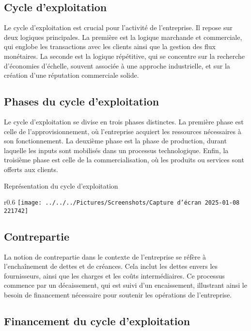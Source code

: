 \documentclass[a4paper, 12pt]{report}
\begin{document}
\subsection{Cycle d'exploitation}

Le cycle d'exploitation est crucial pour l'activité de l'entreprise. Il repose sur deux logiques principales. La première est la logique marchande et commerciale, qui englobe les transactions avec les clients ainsi que la gestion des flux monétaires. La seconde est la logique répétitive, qui se concentre sur la recherche d'économies d'échelle, souvent associée à une approche industrielle, et sur la création d'une réputation commerciale solide.

\subsection{Phases du cycle d'exploitation}

Le cycle d'exploitation se divise en trois phases distinctes. La première phase est celle de l'approvisionnement, où l'entreprise acquiert les ressources nécessaires à son fonctionnement. La deuxième phase est la phase de production, durant laquelle les inputs sont mobilisés dans un processus technologique. Enfin, la troisième phase est celle de la commercialisation, où les produits ou services sont offerts aux clients.
	
Représentation du cycle d'exploitation

\begin{wrapfigure}{r}{0.6\textwidth}
	\centering
\texttt{[image: ../../../Pictures/Screenshots/Capture d'écran 2025-01-08 221742]}
\end{wrapfigure}

\subsection{Contrepartie}

La notion de contrepartie dans le contexte de l'entreprise se réfère à l'enchaînement de dettes et de créances. Cela inclut les dettes envers les fournisseurs, ainsi que les charges et les coûts intermédiaires. Ce processus commence par un décaissement, qui est suivi d'un encaissement, illustrant ainsi le besoin de financement nécessaire pour soutenir les opérations de l'entreprise.
\newpage
\subsection{Financement du cycle d'exploitation}
	
\end{document}
